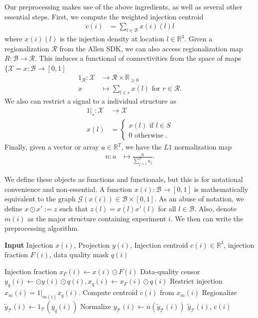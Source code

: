Our preprocessing makes use of the above ingredients, as well as several other essential steps.
First, we compute the weighted injection centroid
\begin{eqnarray*}
c(i) &= \sum_{l \in \mathcal B} x(i)(l) l
\end{eqnarray*}
where $x(i)(l)$ is the injection density at location $l \in \mathbb R^3$.
Given a regionalization $\mathcal R$ from the Allen SDK, we can also access regionalization map $R: \mathcal B  \to \mathcal R $.
This induces a functional of connectivities from the space of maps $\{\mathcal X = x: \mathcal B \to [0,1]$
\begin{eqnarray*}
1_{\mathcal R}: \mathcal X &\to \mathcal R \times \mathbb R_{\geq 0} \\
x &\mapsto \sum_{l \in r}  x(l)  \text{ for } r \in \mathcal R.
\end{eqnarray*}
We also can restrict a signal to a individual structure as
\begin{eqnarray*}
1 |_s :  \mathcal X &\to  \mathcal X \\
 x(l) &= \begin{cases} 
 x(l) \text{ if } l \in S \\
 0 \text{ otherwise }.
 \end{cases}
\end{eqnarray*}
Finally, given a vector or array $a \in \mathbb R^T$, we have the $L1$ normalization map
\begin{eqnarray*}
n: a &\mapsto \frac{a}{\sum_{j = 1}^T a_j}.
\end{eqnarray*}

We define these objects as functions and functionals, but this is for notational convenience and non-essential.
A function $x(i):\mathcal B \to [0,1]$ is mathematically equivalent to the graph $\mathcal G(x(i)) \in \mathcal B \times [0,1]$.
As an abuse of notation, we define $x \odot x' := z$ such that $z(l) = x(l) x'(l)$ for all $l \in \mathcal B$.
Also, denote $m(i)$ as the major structure containing experiment $i$.
We then can write the preprocessing algorithm.

\begin{algorithm}[H]
\caption{{\bf Input} Injection $x(i)$, Projection $y(i)$, Injection centroid $c(i) \in \mathbb R^3$, injection fraction $F(i)$, data quality mask $q(i)$}
\label{alg:preprocess}
\begin{algorithmic}
\State Injection fraction $x_F(i) \gets x(i) \odot F(i)$
\State Data-quality censor $y_q (i) \gets  \odot y(i) \odot q(i) , x_q(i) \gets x_F(i) \odot q(i)$
\State Restrict injection $x_m(i) = 1 |_{m(i)} x_q(i) $.
\State Compute centroid $c(i)$ from $x_m(i) $
\State Regionalize $\tilde y_{\mathcal T} (i) \gets 1_{\mathcal T}(  y_q(i))$
\State Normalize $ y_{\mathcal T} (i) \gets n(\tilde y_{\mathcal T} (i) )$
 $\tilde y_{\mathcal T} (i) $, $c(i)$ 
\end{algorithmic}
\end{algorithm}


